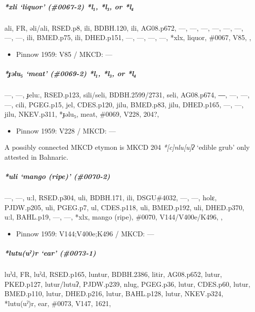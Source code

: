 \documentclass[a4paper,]{article}
\providecommand{\tightlist}{%
  \setlength{\itemsep}{0pt}\setlength{\parskip}{0pt}}
\let\oldsubparagraph\subparagraph
\renewcommand{\subparagraph}[1]{\oldsubparagraph{#1}\mbox{}}
\begin{document}
\subparagraph{\texorpdfstring{\emph{*xli} `liquor' (\#0067-2)
\emph{*l₁}, \emph{*l₃}, or
\emph{*l₄}}{*xli liquor (\#0067-2) *l₁, *l₃, or *l₄}}\label{xli-liquor-0067-2-l-l-or-l}

ali, FR, əli/ali, RSED.p8, ili, BDBH.120, ili, AG08.p672, ---, ---, ---,
---, ---, ---, ---, ---, ili, BMED.p75, ili, DHED.p151, ---, ---, ---,
---, *xlx, liquor, \#0067, V85, ,

\begin{itemize}
\tightlist
\item
  Pinnow 1959: V85 / MKCD: ---
\end{itemize}

\subparagraph{\texorpdfstring{\emph{*ɟəlu₅} `meat' (\#0069-2)
\emph{*l₁}, \emph{*l₃}, or
\emph{*l₄}}{*ɟəlu₅ meat (\#0069-2) *l₁, *l₃, or *l₄}}\label{ux25fux259lu-meat-0069-2-l-l-or-l}

---, ---, ɟelu:, RSED.p123, sili/seli, BDBH.2599/2731, seli, AG08.p674,
―, ---, ---, ---, cili, PGEG.p15, jel, CDES.p120, jilu, BMED.p83, jilu,
DHED.p165, ---, ---, jilu, NKEV.p311, *ɟəlu₅, meat, \#0069, V228, 204?,

\begin{itemize}
\tightlist
\item
  Pinnow 1959: V228 / MKCD: ---
\end{itemize}

A possibly connected MKCD etymon is MKCD 204 \emph{*{[}c{]}nlu{[}u{]}ʔ}
`edible grub' only attested in Bahnaric.

\subparagraph{\texorpdfstring{\emph{*uli} `mango (ripe)'
(\#0070-2)}{*uli mango (ripe) (\#0070-2)}}\label{uli-mango-ripe-0070-2}

---, ---, u:l, RSED.p304, uli, BDBH.171, ili, DSGU\#4032, ---, ---,
holɛ, PJDW.p205, uli, PGEG.p7, ul, CDES.p118, uli, BMED.p192, uli,
DHED.p370, u:l, BAHL.p19, ---, ---, *xlx, mango (ripe), \#0070,
V144/V400e/K496, ,

\begin{itemize}
\tightlist
\item
  Pinnow 1959: V144;V400e;K496 / MKCD: ---
\end{itemize}

\subparagraph{\texorpdfstring{\emph{*lutu(uˀ)r} `ear'
(\#0073-1)}{*lutu(uˀ)r ear (\#0073-1)}}\label{lutuuux2c0r-ear-0073-1}

luˀd, FR, luˀd, RSED.p165, luntur, BDBH.2386, litir, AG08.p652, lutur,
PKED.p127, lutur/lutuʔ, PJDW.p239, nlug, PGEG.p36, lutur, CDES.p60,
lutur, BMED.p110, lutur, DHED.p216, lutur, BAHL.p128, lutur, NKEV.p324,
*lutu(uˀ)r, ear, \#0073, V147, 1621,
\end{document}
